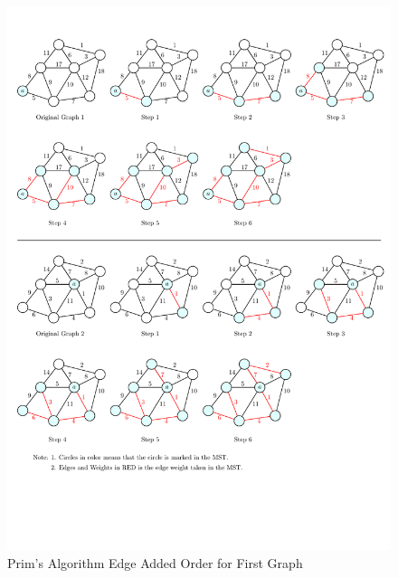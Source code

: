 \begin{homeworkProblem}
\begin{homeworkSubProblem}
    \begin{figure}[H]
        \caption{Prim's Algorithm Edge Added Order for First Graph}\label{3}
        \centering
        \includegraphics[width=\textwidth]{running3}
    \end{figure}
\end{homeworkSubProblem}


\end{homeworkProblem}
